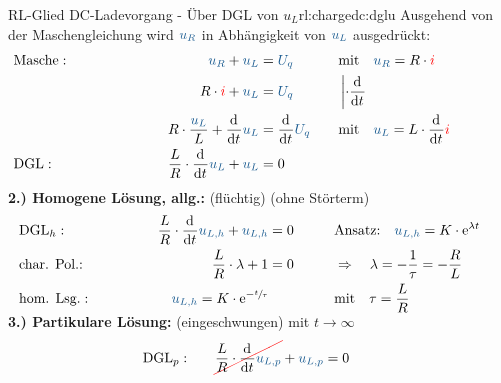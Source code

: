 {\begin{bsp}{RL-Glied DC-Ladevorgang - Über DGL von $u_L$}{rl:chargedc:dglu}
    Ausgehend von der Maschengleichung wird $\ecv{u_R}$ in Abhängigkeit von $\ecv{u_L}$ ausgedrückt:%
    \begingroup%
        \addtolength{\jot}{2pt}%
    \begin{align*}
        &\text{Masche}:&&&
            \ecv{u_R} + \ecv{u_L}  &= \ecv{U_q}&&&
            &\text{mit}\quad \ecv{u_R} = R \cdot \eci{i} \\
        &&&&
            R \cdot \eci{i} + \ecv{u_L} &= \ecv{U_q} &&&
            &\left| \cdot \dt \right. \\
        &&&&
        R \cdot \frac{\ecv{u_L}}{L}  + \dt \ecv{u_L}  &= \dt \ecv{U_q} &&&
            &\text{mit}\quad \ecv{u_L} = L \cdot \dt \eci{i} \\
        &\text{DGL}:&&&
            \frac{L}{R} \cdot \dt \ecv{u_L} + \ecv{u_L}  &= 0
            \\[-15pt]&\hphantom{R1ooooooo}&&&\hphantom{L3oooooooooooooooooooo}&\hphantom{R3ooo}&&&&\hphantom{R5oooooooooooooooooooooo}\nonumber%
        \end{align*}%
    \textbf{2.) Homogene Lösung, allg.:} (flüchtig) (ohne Störterm)%
    \begin{align*}%
        &\text{DGL}_{h}:&&&
            \frac{L}{R} \cdot \dt \ecv{u_{L,h}} + \ecv{u_{L,h}} &= 0 &&&
                &\text{Ansatz:}\quad
                \ecv{u_{L,h}} = K \cdot \mathrm{e}^{\lambda t}\\
        &\text{char. Pol.:}&&&
            \frac{L}{R} \cdot \lambda + 1 &= 0 &&&
                &\Rightarrow\quad \lambda = -\frac{1}{\tau} = -\frac{R}{L}\\
        &\text{hom. Lsg.}:&&&
            \ecv{u_{L,h}} = K \cdot \mathrm{e}^{-\sfrac{t}{\tau}}&&&&
                &\text{mit}\quad \tau = \frac{L}{R}
    \\[-15pt]&\hphantom{R1ooooooo}&&&\hphantom{L3oooooooooooooooooooo}&\hphantom{R3ooo}&&&&\hphantom{R5oooooooooooooooooooooo}\nonumber%
    \end{align*}%
    \textbf{3.) Partikulare Lösung:} (eingeschwungen) mit $t \to \infty$%
    \begin{align*}%
        &\text{DGL}_{p}:&&&
            \redcancel{\frac{L}{R} \cdot \dt \ecv{u_{L,p}}} + \ecv{u_{L,p}} &= 0 &&&

\end{align*}
\end{bsp}}
